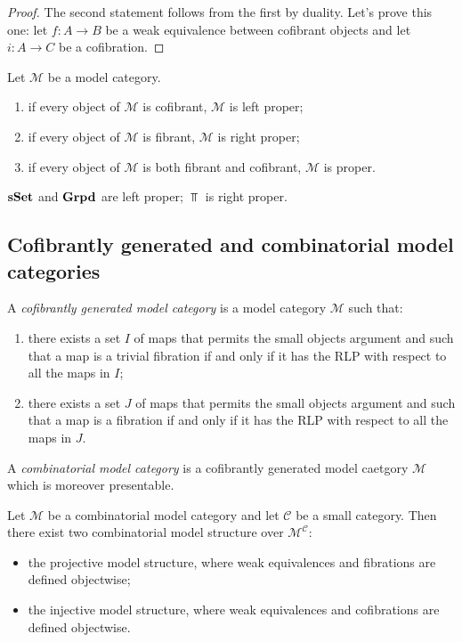 \begin{refsection}
\begin{proof}
The second statement follows from the first by duality. Let's prove this one: let $f \colon A \to B$ be a weak equivalence between cofibrant objects and let $i \colon A \to C$ be a cofibration.
\end{proof}

\begin{cor}
Let $\mathcal M$ be a model category.
\begin{enumerate}
\item if every object of $\mathcal M$ is cofibrant, $\mathcal M$ is left proper;
\item if every object of $\mathcal M$ is fibrant, $\mathcal M$ is right proper;
\item if every object of $\mathcal M$ is both fibrant and cofibrant, $\mathcal M$ is proper.
\end{enumerate}
\end{cor}

\begin{cor}
$\mathbf{sSet}$ and $\mathbf{Grpd}$ are left proper; $\Top$ is right proper.
\end{cor}

\subsection{Cofibrantly generated and combinatorial model categories}

\begin{defin}
A \emph{cofibrantly generated model category} is a model category $\mathcal M$ such that:
\begin{enumerate}
\item there exists a set $I$ of maps that permits the small objects argument and such that a map is a trivial fibration if and only if it has the RLP with respect to all the maps in $I$;
\item there exists a set $J$ of maps that permits the small objects argument and such that a map is a fibration if and only if it has the RLP with respect to all the maps in $J$.
\end{enumerate}
\end{defin}

\begin{defin} \label{def combinatorial}
A \emph{combinatorial model category} is a cofibrantly generated model caetgory $\mathcal M$ which is moreover presentable.
\end{defin}

\begin{thm} \label{thm combinatorial functor cat}
Let $\mathcal M$ be a combinatorial model category and let $\mathcal C$ be a small category. Then there exist two combinatorial model structure over $\mathcal M^{\mathcal C}$:
\begin{itemize}
\item the projective model structure, where weak equivalences and fibrations are defined objectwise;
\item the injective model structure, where weak equivalences and cofibrations are defined objectwise.
\end{itemize}
\end{thm}


\end{refsection}
